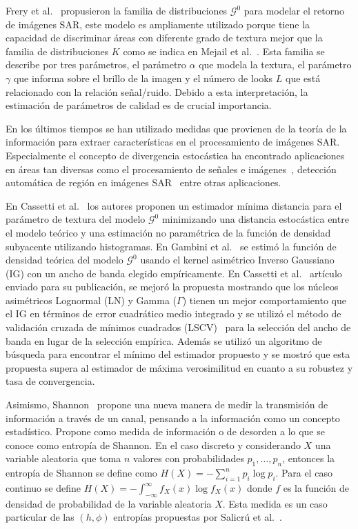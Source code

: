 \documentclass[11pt]{article}
\begin{document}
Frery et al.~\cite{Frery97} propusieron la familia de distribuciones $\mathcal{G}^0$ para modelar el retorno de imágenes SAR, este modelo es ampliamente utilizado porque tiene la capacidad de discriminar áreas con diferente grado de textura mejor que la familia de distribuciones $K$ como se indica en Mejail et al.~\cite{MejailJacoboFreryBustos:IJRS}.
Esta familia se describe por tres parámetros, el parámetro $\alpha$ que modela la textura, el parámetro $\gamma$ que informa sobre el brillo de la imagen y el número de looks $L$ que está relacionado con la relación señal/ruido. Debido a esta interpretación, la estimación de parámetros de calidad es de crucial importancia.


En los últimos tiempos se han utilizado medidas que provienen de la teoría de la información para extraer características en el procesamiento de imágenes SAR. Especialmente el concepto de divergencia estocástica ha encontrado aplicaciones en áreas tan diversas como el procesamiento de señales e imágenes~\cite {Aviyente2007}, detección automática de región en imágenes SAR~\cite{SilvaCribariFrery:ImprovedLikelihood:Environmetrics, Nascimento2009} entre otras aplicaciones.

En Cassetti et al.~\cite{APSAR2013ParameterEstimationStochasticDistances} los autores proponen un estimador mínima distancia para el parámetro de textura del modelo $\mathcal{G}^0$ minimizando una distancia estocástica entre el modelo teórico y una estimación no paramétrica de la función de densidad subyacente utilizando histogramas. En Gambini et al.~\cite{gambini2015} se estimó la función de densidad teórica del modelo $\mathcal{G}^0$  usando el kernel asimétrico Inverso Gaussiano (IG) con un ancho de banda elegido empíricamente. En Cassetti et al.~\cite{Cassetti2020} artículo enviado para su publicación, se mejoró la propuesta mostrando que los núcleos asimétricos Lognormal (LN) y Gamma ($\Gamma$) tienen un mejor comportamiento que el IG en términos de error cuadrático medio integrado y se utilizó el método de validación cruzada de mínimos cuadrados (LSCV)~\cite{Rudemo1982} para la selección del ancho de banda en lugar de la selección empírica. Además se utilizó un algoritmo de búsqueda para encontrar el mínimo del estimador propuesto y se mostró que esta propuesta supera al estimador de máxima verosimilitud en cuanto a su robustez y tasa de convergencia.

Asimismo, Shannon~\cite{Shannon1948} propone una nueva manera de medir la transmisión de información a través de un canal, pensando a la información como un concepto estadístico. Propone como medida de información o de desorden a lo que se conoce como entropía de Shannon. En el caso discreto y considerando $X$ una variable aleatoria que toma $n$ valores con probabilidades $p_1,\ldots,p_n$, entonces la entropía de Shannon se define como $H(X)=-\sum_{i=1}^n p_i \log p_i$. Para el caso continuo se define $H(X)=-\int_{-\infty}^{\infty} f_X(x) \log f_X(x)$ donde $f$ es la función de densidad de probabilidad de la variable aleatoria $X$. Esta medida es un caso particular de las $(h,\phi)$ entropías propuestas por Salicrú et al.~\cite{salicruetal1993}.
\end{document}
